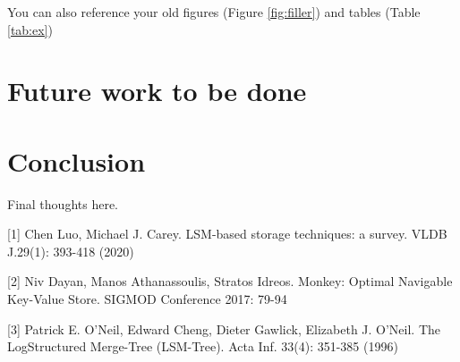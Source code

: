 \documentclass[sigconf]{acmart}
\begin{document}
You can also reference your old figures (Figure \ref{fig:filler}) and tables 
(Table \ref{tab:ex})
\section{Future work to be done}

\section{Conclusion}

Final thoughts here.

{
    
    

[1] Chen Luo, Michael J. Carey. LSM-based storage techniques: a survey. VLDB J.29(1): 393-418 (2020)

[2] Niv Dayan, Manos Athanassoulis, Stratos Idreos. Monkey: Optimal Navigable
Key-Value Store. SIGMOD Conference 2017: 79-94

[3] Patrick E. O'Neil, Edward Cheng, Dieter Gawlick, Elizabeth J. O'Neil. The LogStructured Merge-Tree (LSM-Tree). Acta Inf. 33(4): 351-385 (1996)
} 
\end{document}
